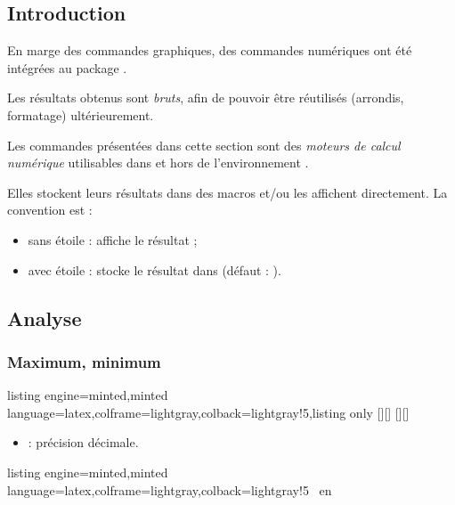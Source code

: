 \documentclass[11pt,a4paper]{ltxdoc}
\begin{document}
\subsection{Introduction}

En marge des commandes graphiques, des commandes numériques ont été intégrées au package .

Les résultats obtenus sont \textit{bruts}, afin de pouvoir être réutilisés (arrondis, formatage) ultérieurement.

\smallskip

Les commandes présentées dans cette section sont des \textit{moteurs de calcul numérique} utilisables dans et hors de l'environnement .

Elles stockent leurs résultats dans des macros et/ou les affichent directement. La convention est :

\begin{itemize}
  \item sans étoile  : affiche le résultat ;
  \item avec étoile  : stocke le résultat dans  (défaut : ).
\end{itemize}

\subsection{Analyse}

\subsubsection{Maximum, minimum}

\begin{tcblisting}{listing engine=minted,minted language=latex,colframe=lightgray,colback=lightgray!5,listing only}
[\macromax][\macroxmax]
[\macromin][\macroxmin]
\end{tcblisting}

\begin{itemize}
  \item \MontreCode{[précision]} : précision décimale.
\end{itemize}

\begin{tcblisting}{listing engine=minted,minted language=latex,colframe=lightgray,colback=lightgray!5}
\tmpmax\ en \tmpmaxvalx
\end{tcblisting}
\end{document}
